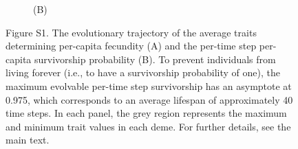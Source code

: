 \documentclass[11pt]{article}
\begin{document}
\begin{figure}[h!]
\begin{subfigure}[b]{0.49\textwidth}
	\caption*{(B)}
  	\end{subfigure}
\caption*{Figure S1. The evolutionary trajectory of the average traits determining per-capita fecundity (A) and the per-time step per-capita survivorship probability (B). To prevent individuals from living forever (i.e., to have a survivorship probability of one), the maximum evolvable per-time step survivorship has an asymptote at 0.975, which corresponds to an average lifespan of approximately 40 time steps. In each panel, the grey region represents the maximum and minimum trait values in each deme. For further details, see the main text.}

\end{figure}
\end{document}
